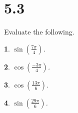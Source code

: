 \documentclass[12pt]{amsart}
\theoremstyle{plain}
\newtheorem{thm}{}
\begin{document}
\newpage

\section*{5.3}
Evaluate the following.

\setcounter{thm}{1}
\begin{thm}
  $\displaystyle{\sin\left(\frac{7\pi}{4}\right)}$.
\end{thm}

\setcounter{thm}{3}
\begin{thm}
  $\displaystyle{\cos\left(\frac{-3\pi}{4}\right)}$.
\end{thm}

\setcounter{thm}{7}
\begin{thm}
  $\displaystyle{\cos\left(\frac{13\pi}{6}\right)}$.
\end{thm}

\setcounter{thm}{11}
\begin{thm}
  $\displaystyle{\sin\left(\frac{29\pi}{6}\right)}$.
\end{thm}
\end{document}
